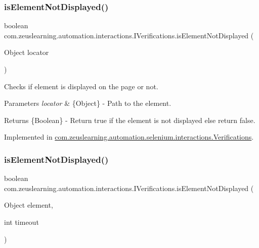 \subsubsection{\texorpdfstring{is\+Element\+Not\+Displayed()}{isElementNotDisplayed()}\hspace{0.1cm}{\footnotesize\ttfamily [1/2]}}
{\footnotesize\ttfamily boolean com.\+zeuslearning.\+automation.\+interactions.\+I\+Verifications.\+is\+Element\+Not\+Displayed (\begin{DoxyParamCaption}\item[{Object}]{locator }\end{DoxyParamCaption})}

Checks if element is displayed on the page or not.


\begin{DoxyParams}{Parameters}
{\em locator} & \{Object\} -\/ Path to the element. \\
\hline
\end{DoxyParams}
\begin{DoxyReturn}{Returns}
\{Boolean\} -\/ Return {\ttfamily true} if the element is not displayed else return false. 
\end{DoxyReturn}


Implemented in \hyperlink{classcom_1_1zeuslearning_1_1automation_1_1selenium_1_1interactions_1_1Verifications_ab6c1a1245269d660bdcd26eff9ac35ad}{com.\+zeuslearning.\+automation.\+selenium.\+interactions.\+Verifications}.

\hypertarget{interfacecom_1_1zeuslearning_1_1automation_1_1interactions_1_1IVerifications_ae316099347aefe61a68670c2f5fedaea}{}\label{interfacecom_1_1zeuslearning_1_1automation_1_1interactions_1_1IVerifications_ae316099347aefe61a68670c2f5fedaea} 
\subsubsection{\texorpdfstring{is\+Element\+Not\+Displayed()}{isElementNotDisplayed()}\hspace{0.1cm}{\footnotesize\ttfamily [2/2]}}
{\footnotesize\ttfamily boolean com.\+zeuslearning.\+automation.\+interactions.\+I\+Verifications.\+is\+Element\+Not\+Displayed (\begin{DoxyParamCaption}\item[{Object}]{element,  }\item[{int}]{timeout }\end{DoxyParamCaption})}

